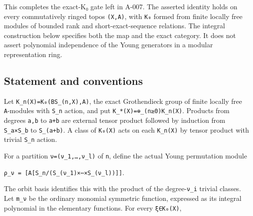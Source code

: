 \documentclass[
  10pt,
]{article}
\begin{document}
This completes the exact-K₀ gate left in A-007. The asserted identity
holds on every commutatively ringed topos
\texttt{\small (\allowbreak{}X,\allowbreak{}A)\allowbreak{}}, with
\texttt{\small K₀} formed from finite locally free modules of bounded
rank and short-exact-sequence relations. The integral construction below
specifies both the map and the exact category. It does not assert
polynomial independence of the Young generators in a modular
representation ring.

\subsection{Statement and conventions}\label{statement-and-conventions}

Let
\texttt{\small K\_\allowbreak{}n(\allowbreak{}X)\allowbreak{}=\allowbreak{}K₀(\allowbreak{}BS\_\allowbreak{}(\allowbreak{}n,\allowbreak{}X)\allowbreak{},\allowbreak{}A)\allowbreak{}},
the exact Grothendieck group of finite locally free
\texttt{\small A}-modules with \texttt{\small S\_\allowbreak{}n} action,
and put
\texttt{\small K\_\allowbreak{}*(\allowbreak{}X)\allowbreak{}=\allowbreak{}⊕\allowbreak{}\_\allowbreak{}(\allowbreak{}n≥\allowbreak{}0)\allowbreak{}K\_\allowbreak{}n(\allowbreak{}X)\allowbreak{}}.
Products from degrees \texttt{\small a,\allowbreak{}b} to
\texttt{\small a+\allowbreak{}b} are external tensor product followed by
induction from \texttt{\small S\_\allowbreak{}a×S\_\allowbreak{}b} to
\texttt{\small S\_\allowbreak{}(\allowbreak{}a+\allowbreak{}b)\allowbreak{}}.
A class of \texttt{\small K₀(\allowbreak{}X)\allowbreak{}} acts on each
\texttt{\small K\_\allowbreak{}n(\allowbreak{}X)\allowbreak{}} by tensor
product with trivial \texttt{\small S\_\allowbreak{}n} action.

For a partition
\texttt{\small ν=\allowbreak{}(\allowbreak{}ν\_\allowbreak{}1,\allowbreak{}…,\allowbreak{}ν\_\allowbreak{}l)\allowbreak{}}
of \texttt{\small n}, define the actual Young permutation module

\texttt{\small ρ\_\allowbreak{}ν =\allowbreak{} [\allowbreak{}A[\allowbreak{}S\_\allowbreak{}n/\allowbreak{}(\allowbreak{}S\_\allowbreak{}(\allowbreak{}ν\_\allowbreak{}1)\allowbreak{}×⋯×S\_\allowbreak{}(\allowbreak{}ν\_\allowbreak{}l)\allowbreak{})\allowbreak{}]\allowbreak{}]\allowbreak{}}.

The orbit basis identifies this with the product of the
degree-\texttt{\small ν\_\allowbreak{}i} trivial classes. Let
\texttt{\small m\_\allowbreak{}ν} be the ordinary monomial symmetric
function, expressed as its integral polynomial in the elementary
functions. For every \texttt{\small ξ∈K₀(\allowbreak{}X)\allowbreak{}},
\end{document}

